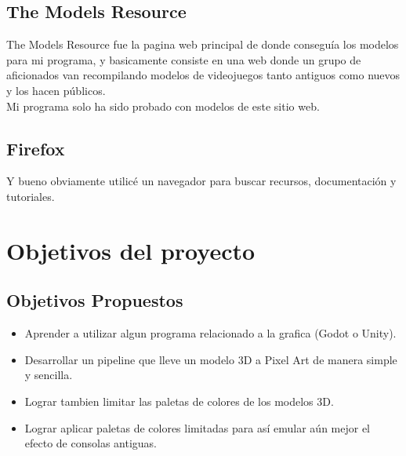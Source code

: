\subsection{The Models Resource}
        The Models Resource fue la pagina web principal de donde conseguía los modelos para mi programa,
        y basicamente consiste en una web donde un grupo de aficionados van recompilando modelos de videojuegos
        tanto antiguos como nuevos y los hacen públicos. \\

        Mi programa solo ha sido probado con modelos de este sitio web.  

\subsection{Firefox}
        Y bueno obviamente utilicé un navegador para buscar recursos, documentación y tutoriales.

\clearpage



\section{Objetivos del proyecto}

\subsection{Objetivos Propuestos}
	\begin{itemize}
	   \item Aprender a utilizar algun programa relacionado a la grafica (Godot o Unity).
	   \item Desarrollar un pipeline que lleve un modelo 3D a Pixel Art de manera simple y sencilla.
	   \item Lograr tambien limitar las paletas de colores de los modelos 3D.
       \item Lograr aplicar paletas de colores limitadas para así emular aún mejor el efecto de consolas antiguas.
	\end{itemize}


